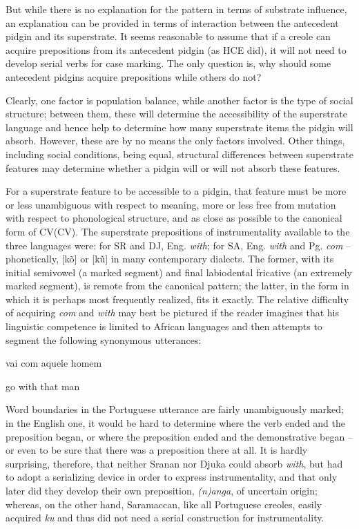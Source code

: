 But while there is no explanation for the pattern in terms of substrate influence, an explanation can be provided in terms of interaction between the antecedent pidgin and its superstrate. It seems reasonable to assume that if a creole can acquire prepositions from its antecedent pidgin (as HCE did), it will not need to develop serial verbs for case marking. The only question is, why should some antecedent pidgins acquire prepositions while others do not?

Clearly, one factor is population balance, while another factor is the type of social structure; between them, these will determine the accessibility of the superstrate language and hence help to deter\-mine how many superstrate items the pidgin will absorb. However, these are by no means the only factors involved. Other things, including social conditions, being equal, structural differences between super\-strate features may determine whether a pidgin will or will not absorb these features.

For a superstrate feature to be accessible to a pidgin, that feature must be more or less unambiguous with respect to meaning, more or less free from mutation with respect to phonological structure, and as close as possible to the canonical form of CV(CV). The superstrate prepositions of instrumentality available to the three languages were: for SR and DJ, Eng. \textit{with}; for SA, Eng. \textit{with} and Pg. \textit{com} -- phonetically, [k\~o] or [k\~u] in many contemporary dialects. The former, with its initial semivowel (a marked segment) and final labiodental fricative (an extremely marked segment), is remote from the canonical pattern; the latter, in the form in which it is perhaps most frequently realized, fits it exactly. The relative difficulty of acquiring \textit{com} and \textit{with} may best be pictured if the reader imagines that his linguistic competence
is limited to African languages and then attempts to segment the following synonymous utterances:

\ea\label{ex:2:234}
vai com aquele homem
\z

\ea\label{ex:2:235}
go with that man
\z

Word boundaries in the Portuguese utterance are fairly un\-ambiguously marked; in the English one, it would be hard to determine where the verb ended and the preposition began, or where the preposi\-tion ended and the demonstrative began -- or even to be sure that there was a preposition there at all. It is hardly surprising, therefore, that neither Sranan nor Djuka could absorb \textit{with}, but had to adopt a serializing device in order to express instrumentality, and that only later did they develop their own preposition, \textit{(n)anga}, of uncertain origin; whereas, on the other hand, Saramaccan, like all Portuguese creoles, easily acquired \textit{ku} and thus did not need a serial construction for instrumentality.

